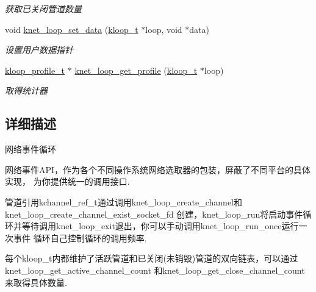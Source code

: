 \begin{DoxyCompactItemize}
\begin{DoxyCompactList}\small\item\em 获取已关闭管道数量 \end{DoxyCompactList}\item 
void \hyperlink{a00108_gaf1239ea65307d7dc588175c45947437b_gaf1239ea65307d7dc588175c45947437b}{knet\+\_\+loop\+\_\+set\+\_\+data} (\hyperlink{a00053_a97fc76209a58362019f1ded9169e397f_a97fc76209a58362019f1ded9169e397f}{kloop\+\_\+t} $\ast$loop, void $\ast$data)
\begin{DoxyCompactList}\small\item\em 设置用户数据指针 \end{DoxyCompactList}\item 
\hyperlink{a00053_ab75a5c23099a6118c469ed160b277f28_ab75a5c23099a6118c469ed160b277f28}{kloop\+\_\+profile\+\_\+t} $\ast$ \hyperlink{a00108_gafc6a946f7c7fd4fb0508ac0f88969da1_gafc6a946f7c7fd4fb0508ac0f88969da1}{knet\+\_\+loop\+\_\+get\+\_\+profile} (\hyperlink{a00053_a97fc76209a58362019f1ded9169e397f_a97fc76209a58362019f1ded9169e397f}{kloop\+\_\+t} $\ast$loop)
\begin{DoxyCompactList}\small\item\em 取得统计器 \end{DoxyCompactList}\end{DoxyCompactItemize}


\subsection{详细描述}
网络事件循环 


\begin{DoxyPre}
网络事件API，作为各个不同操作系统网络选取器的包装，屏蔽了不同平台的具体实现，
为你提供统一的调用接口.\end{DoxyPre}



\begin{DoxyPre}管道引用kchannel\_ref\_t通过调用knet\_loop\_create\_channel和knet\_loop\_create\_channel\_exist\_socket\_fd
创建，knet\_loop\_run将启动事件循环并等待调用knet\_loop\_exit退出，你可以手动调用knet\_loop\_run\_once运行一次事件
循环自己控制循环的调用频率.\end{DoxyPre}



\begin{DoxyPre}每个kloop\_t内都维护了活跃管道和已关闭(未销毁)管道的双向链表，可以通过knet\_loop\_get\_active\_channel\_count
和knet\_loop\_get\_close\_channel\_count来取得具体数量.\end{DoxyPre}



